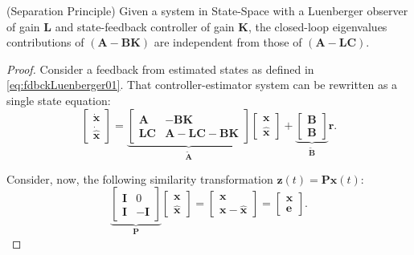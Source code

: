 \documentclass[a4paper,11pt]{book}
\numberwithin{figure}{chapter}
\numberwithin{equation}{chapter}
\numberwithin{table}{chapter}
\newtheorem{theorem}{Theorem}[chapter]
\theoremstyle{definition}
\newcounter{boxed-theorem}
\newenvironment{boxed-theorem}[1]
{\colorlet{shadecolor}{pastelBlue2!10} \begin{shaded} \begin{theorem}{#1}}
{\end{theorem} \end{shaded}}
\newcounter{boxed-definition}
\newcounter{boxed-example}
\begin{document}
\begin{boxed-theorem}{(Separation Principle)} \label{th:separationPrinciple}
    Given a system in State-Space with a Luenberger observer of gain $\bm{L}$ and state-feedback controller of gain $\bm{K}$, the closed-loop eigenvalues contributions of $(\bm{A} - \bm{B}\bm{K})$ are independent from those of $(\bm{A} - \bm{L}\bm{C})$.
\end{boxed-theorem}

\begin{proof}
    Consider a feedback from estimated states as defined in \eqref{eq:fdbckLuenberger01}. That controller-estimator system can be rewritten as a single state equation:
    \begin{equation}
    \begin{bmatrix} \dot{\bm{x}} \\ \dot{\hat{\bm{x}}}  \end{bmatrix}
    =
    \underbrace{\begin{bmatrix}
        \bm{A} & - \bm{B} \bm{K} \\
        \bm{L} \bm{C} & \bm{A} - \bm{L} \bm{C} - \bm{B} \bm{K}
    \end{bmatrix}}_{\tilde{\bm{A}}} \begin{bmatrix} \bm{x} \\ \hat{\bm{x}} \end{bmatrix}
    +
    \underbrace{\begin{bmatrix} \bm{B} \\ \bm{B} \end{bmatrix}}_{\tilde{\bm{B}}} \bm{r}
.\end{equation} 

Consider, now, the following similarity transformation $\bm{z}(t) = \bm{P} \bm{x}(t)$:
\begin{equation}
    \underbrace{\begin{bmatrix}
        \bm{I} & 0 \\ \bm{I} & -\bm{I}
    \end{bmatrix}}_{\bm{P}} \begin{bmatrix}
        \bm{x} \\ \hat{\bm{x}}
    \end{bmatrix} = \begin{bmatrix}
        \bm{x} \\ \bm{x} - \hat{\bm{x}}
    \end{bmatrix} = \begin{bmatrix}
        \bm{x} \\ \bm{e}
    \end{bmatrix} 
.\end{equation}


\end{proof}
\end{document}
